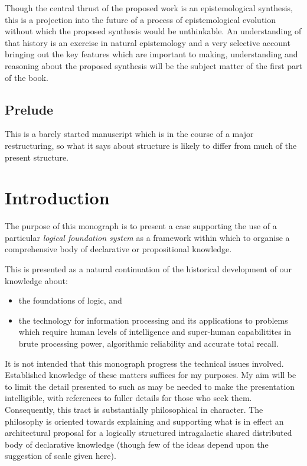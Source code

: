 \documentclass[10pt,titlepage]{book}
\begin{document}
Though the central thrust of the proposed work is an epistemological synthesis, this is a projection into the future of a process of epistemological evolution without which the proposed synthesis would be unthinkable.  An understanding of that history is an exercise in natural epistemology and a very selective account bringing out the key features which are important to making, understanding and reasoning about the proposed synthesis will be the subject matter of the first part of the book.

\section*{Prelude}

This is a barely started manuscript which is in the course of a major restructuring, so what it says about structure is likely to differ from much of the present structure.


\chapter{Introduction}

The purpose of this monograph is to present a case supporting the use of a particular \emph{logical foundation system} as a framework within which to organise a comprehensive body of declarative or propositional knowledge.

This is presented as a natural continuation of the historical development of our knowledge about:
\begin{itemize}
\item the foundations of logic, and
\item the technology for information processing and its applications to problems which require human levels of intelligence and super-human capabilitites in brute processing power, algorithmic reliability and accurate total recall.
\end{itemize}

It is not intended that this monograph progress the technical issues involved.
Established knowledge of these matters suffices for my purposes.
My aim will be to limit the detail presented to such as may be needed to make the presentation intelligible, with references to fuller details for those who seek them.
Consequently, this tract is substantially philosophical in character.
The philosophy is oriented towards explaining and supporting what is in effect an architectural proposal for a  logically structured intragalactic shared distributed body of declarative knowledge (though few of the ideas depend upon the suggestion of scale given here).
\end{document}
